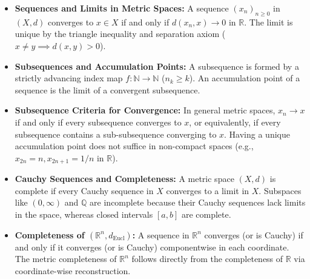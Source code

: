 \begin{overview}
\begin{itemize}
    \item \textbf{Sequences and Limits in Metric Spaces:} A sequence $(x_n)_{n \ge 0}$ in $(X, d)$ converges to $x \in X$ if and only if $d(x_n, x) \to 0$ in $\mathbb{R}$. The limit is unique by the triangle inequality and separation axiom ($x \neq y \implies d(x, y) > 0$).
    \item \textbf{Subsequences and Accumulation Points:} A subsequence is formed by a strictly advancing index map $f \colon \mathbb{N} \to \mathbb{N}$ ($n_k \ge k$). An accumulation point of a sequence is the limit of a convergent subsequence.
    \item \textbf{Subsequence Criteria for Convergence:} In general metric spaces, $x_n \to x$ if and only if every subsequence converges to $x$, or equivalently, if every subsequence contains a sub-subsequence converging to $x$. Having a unique accumulation point does not suffice in non-compact spaces (e.g., $x_{2n} = n, x_{2n+1} = 1/n$ in $\mathbb{R}$).
    \item \textbf{Cauchy Sequences and Completeness:} A metric space $(X, d)$ is complete if every Cauchy sequence in $X$ converges to a limit in $X$. Subspaces like $(0, \infty)$ and $\mathbb{Q}$ are incomplete because their Cauchy sequences lack limits in the space, whereas closed intervals $[a, b]$ are complete.
    \item \textbf{Completeness of $(\mathbb{R}^n, d_{\text{Eucl}})$:} A sequence in $\mathbb{R}^n$ converges (or is Cauchy) if and only if it converges (or is Cauchy) componentwise in each coordinate. The metric completeness of $\mathbb{R}^n$ follows directly from the completeness of $\mathbb{R}$ via coordinate-wise reconstruction.
\end{itemize}
\end{overview}